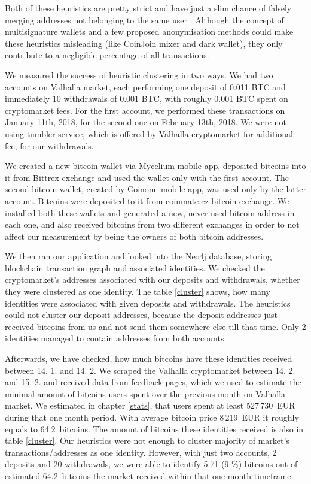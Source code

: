 \documentclass[
  digital, %
  table,   %
  lof,     %
  lot,     %
  oneside
]{fithesis3}
\begin{document}
Both of these heuristics are pretty strict and have just a slim chance of falsely merging
addresses not belonging to the same user \parencite{androulaki2013evaluating}.
Although the concept of multisignature wallets and a few proposed anonymisation methods could make
these heuristics misleading (like CoinJoin mixer and dark wallet), they only contribute to a negligible percentage of all transactions.

We measured the success of heuristic clustering in two ways.
We had two accounts on Valhalla market, each performing one deposit of 0.011 BTC and immediately 10 withdrawals of
0.001 BTC, with roughly 0.001 BTC spent on cryptomarket fees.
For the first account, we performed these transactions on January 11th, 2018, for the second one on February 13th, 2018.
We were not using tumbler service, which is offered by Valhalla cryptomarket for additional fee, for our withdrawals.

We created a new bitcoin wallet via Mycelium mobile app, deposited bitcoins into it
from Bittrex exchange and used the wallet only with the first account.
The second bitcoin wallet, created by Coinomi mobile app, was used only by the latter account. 
Bitcoins were deposited to it from coinmate.cz bitcoin exchange.
We installed both these wallets and generated a new, never used bitcoin address in each one, and also
received bitcoins from two different exchanges in order to not affect
our measurement by being the owners of both bitcoin addresses.

We then ran our application and looked into the Neo4j database, storing
blockchain transaction graph and associated identities.
We checked the cryptomarket's addresses associated with our deposits and withdrawals,
whether they were clustered as one identity. The table \ref{cluster} shows, how many identities
were associated with given deposits and withdrawals. The heuristics could not cluster our
deposit addresses, because the deposit addresses just received bitcoins from us and not send them
somewhere else till that time. Only 2 identities managed to contain addresses from both accounts.

Afterwards, we have checked, how much bitcoins have these
identities received between 14. 1. and 14. 2. We scraped the Valhalla cryptomarket between 14. 2. and 15. 2.
and received data from feedback pages, which we used to estimate the minimal amount of bitcoins users spent over the previous month on Valhalla market.
We estimated in chapter \ref{stats}, that users spent at least 527\,730~EUR during that one month period.
With average bitcoin price 8\,219~EUR it roughly equals to 64.2~bitcoins.
The amount of bitcoins these identities received is also in table \ref{cluster}.
Our heuristics were not enough to cluster majority of market's transactions/addresses as one identity.
However, with just two accounts, 2 deposits and 20 withdrawals, we were able to identify 5.71 (9 \%) bitcoins out of estimated
\mbox{64.2~bitcoins} the market received within that one-month timeframe.
\end{document}
